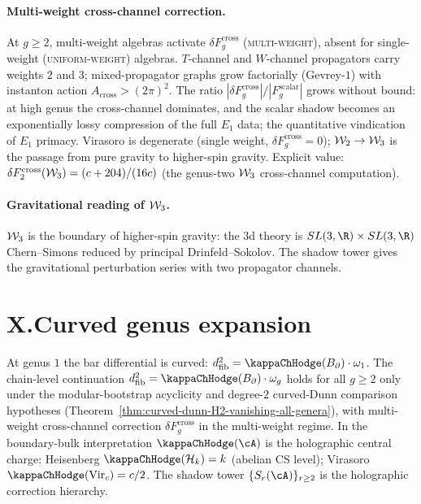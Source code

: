 \paragraph{Multi-weight cross-channel correction.}
At $g \ge 2$, multi-weight algebras activate
$\delta F_g^{\mathrm{cross}}$ \textup{(\textsc{multi-weight})},
absent for single-weight (\textsc{uniform-weight}) algebras.
$T$-channel and $W$-channel propagators carry weights $2$ and
$3$; mixed-propagator graphs grow factorially (Gevrey-$1$) with
instanton action $A_{\mathrm{cross}} > (2\pi)^2$. The ratio
$|\delta F_g^{\mathrm{cross}}|/|F_g^{\mathrm{scalar}}|$ grows
without bound: at high genus the cross-channel dominates, and
the scalar shadow becomes an exponentially lossy compression of
the full $E_1$ data; the quantitative vindication of $E_1$
primacy. Virasoro is degenerate (single weight,
$\delta F_g^{\mathrm{cross}} = 0$);
$\mathcal{W}_2 \to \mathcal{W}_3$ is the passage from pure gravity to higher-spin
gravity. Explicit value: $\delta F_2^{\mathrm{cross}}(\mathcal{W}_3) =
(c+204)/(16c)$
(the genus-two $\mathcal{W}_3$ cross-channel computation).

\paragraph{Gravitational reading of $\mathcal{W}_3$.}
$\mathcal{W}_3$ is the boundary of higher-spin gravity: the 3d theory is
$SL(3,\R) \times SL(3,\R)$ Chern--Simons reduced by principal
Drinfeld--Sokolov. The shadow tower gives the gravitational
perturbation series with two propagator channels.

\section*{X.\quad Curved genus expansion}

At genus $1$ the bar differential is curved:
$d_{\mathrm{fib}}^2 = \kappaChHodge(\Bbound) \cdot \omega_1$.
The chain-level continuation
$d_{\mathrm{fib}}^2 = \kappaChHodge(\Bbound) \cdot \omega_g$
holds for all $g \ge 2$ only under the modular-bootstrap acyclicity
and degree-$2$ curved-Dunn comparison hypotheses
(Theorem~\ref{thm:curved-dunn-H2-vanishing-all-genera}), with
multi-weight cross-channel correction
$\delta F_g^{\mathrm{cross}}$ in the multi-weight regime. In
the boundary-bulk interpretation $\kappaChHodge(\cA)$ is
the holographic central charge: Heisenberg
$\kappaChHodge(\cH_k) = k$ (abelian CS level); Virasoro
$\kappaChHodge(\mathrm{Vir}_c) = c/2$. The shadow tower
$\{S_r(\cA)\}_{r \ge 2}$ is the holographic correction
hierarchy.

